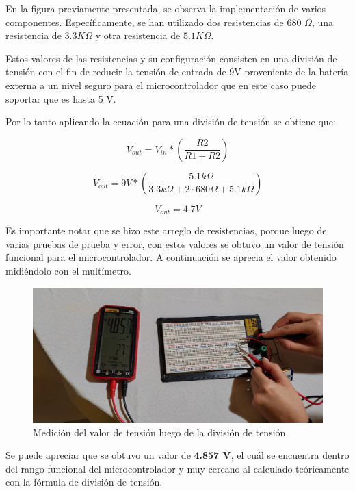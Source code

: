 En la figura previamente presentada, se observa la implementación de varios componentes. Específicamente, se han utilizado dos resistencias de 680 $\Omega$, una resistencia de $3.3 K\Omega$ y otra resistencia de $5.1 K\Omega$.

Estos valores de las resistencias y su configuración consisten en una división de tensión con el fin de reducir la tensión de entrada de 9V proveniente de la batería externa a un nivel seguro para el microcontrolador que en este caso puede soportar que es hasta 5 V. 

Por lo tanto aplicando la ecuación para una división de tensión se obtiene que:

\begin{equation}
    V_{out} = V_{in} * (\frac{R2}{R1 + R2})
\end{equation}


\begin{equation}
    V_{out} = 9V * (\frac{5.1k\Omega}{3.3k\Omega + 2 \cdot 680 \Omega + 5.1k \Omega})
\end{equation}

\begin{equation}
    V_{out} = 4.7 V
\end{equation}

Es importante notar que se hizo este arreglo de resistencias, porque luego de varias pruebas de prueba y error, con estos valores se obtuvo un valor de tensión funcional para el microcontrolador. A continuación se aprecia el valor obtenido midiéndolo con el multímetro.

\begin{figure}[H]
    \centering
    \includegraphics[scale=0.1, angle=90]{images/Medicion.jpg}
    \caption{Medición del valor de tensión luego de la división de tensión}
    \label{fig:circuito}
\end{figure}

Se puede apreciar que se obtuvo un valor de \textbf{4.857 V}, el cuál se encuentra dentro del rango funcional del microcontrolador y muy cercano al calculado teóricamente con la fórmula de división de tensión. 


